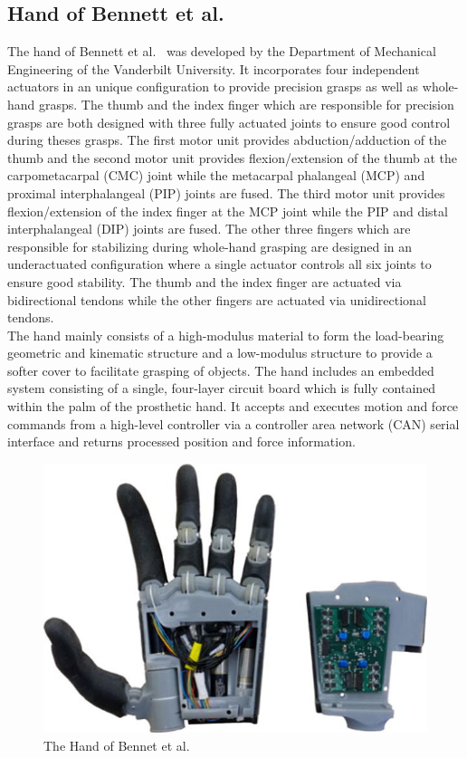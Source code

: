 \documentclass[a4paper, 10pt, conference]{ieeeconf}      %
\begin{document}
\subsection{Hand of Bennett et al.}

The hand of Bennett et al.~\cite{bennett} was developed by the Department of Mechanical Engineering of the Vanderbilt University. It incorporates four independent actuators in an unique configuration to provide precision grasps as well as whole-hand grasps. The thumb and the index finger which are responsible for precision grasps are both designed with three fully actuated joints to ensure good control during theses grasps. The first motor unit provides abduction/adduction of the thumb and the second motor unit provides flexion/extension of the thumb at the carpometacarpal (CMC) joint while the metacarpal phalangeal (MCP) and proximal interphalangeal (PIP) joints are fused. The third motor unit provides flexion/extension of the index finger at the MCP joint while the PIP and distal interphalangeal (DIP) joints are fused. The other three fingers which are responsible for stabilizing during whole-hand grasping are designed in an underactuated configuration where a single actuator controls all six joints to ensure good stability. The thumb and the index finger are actuated via bidirectional tendons while the other fingers are actuated via unidirectional tendons.\\
The hand mainly consists of a high-modulus material to form the load-bearing geometric and kinematic structure and a low-modulus structure to provide a softer cover to facilitate grasping of objects. The hand includes an embedded system consisting of a single, four-layer circuit board which is fully contained within the palm of the prosthetic hand. It accepts and executes motion and force commands from a high-level controller via a controller area network (CAN) serial interface and returns processed position and force information.

\begin{figure}[h]

	\centering
	\includegraphics[scale=0.7]{images/Bennett}
	
	\caption{The Hand of Bennet et al.}
\end{figure}
\end{document}
